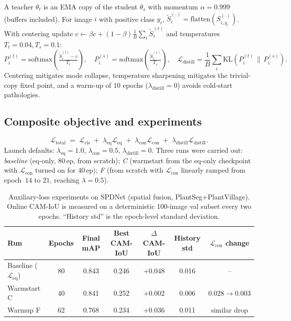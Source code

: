 \documentclass[11pt,a4paper]{article}
\newcommand{\Leq}{\mathcal{L}_{\mathrm{eq}}}
\newcommand{\Lcon}{\mathcal{L}_{\mathrm{con}}}
\newcommand{\Ldist}{\mathcal{L}_{\mathrm{distill}}}
\newcommand{\Lcls}{\mathcal{L}_{\mathrm{cls}}}
\newcommand{\Ltotal}{\mathcal{L}_{\mathrm{total}}}
\begin{document}
A teacher $\theta_t$ is an EMA copy of the student $\theta_s$ with
momentum $\alpha=0.999$ (buffers included). For image $i$ with
positive class $y_i$, $\tilde S^{(\cdot)}_i\!=\!\mathrm{flatten}(S^{(\cdot)}_{i,y_i})$.
With centering update $c\leftarrow\beta c+(1-\beta)\frac1B\sum_i\tilde S^{(t)}_i$
and temperatures $T_t{=}0.04,T_s{=}0.1$:
\begin{equation}
P^{(t)}_i\!=\!\mathrm{softmax}\!\left(\!\tfrac{\tilde S^{(t)}_i-c}{T_t}\!\right)\!,\quad
P^{(s)}_i\!=\!\mathrm{softmax}\!\left(\!\tfrac{\tilde S^{(s)}_i}{T_s}\!\right)\!,\quad
\Ldist\!=\!\frac{1}{B}\!\sum_i\!\mathrm{KL}(P^{(t)}_i\,\|\,P^{(s)}_i).
\label{eq:Ldist}
\end{equation}
Centering mitigates mode collapse, temperature sharpening mitigates the
trivial-copy fixed point, and a warm-up of $10$ epochs
($\lambda_{\mathrm{distill}}{=}0$) avoids cold-start pathologies.

\subsection{Composite objective and experiments}

\begin{equation}
\Ltotal \;=\; \Lcls \;+\; \lambda_{\mathrm{eq}}\Leq \;+\;
\lambda_{\mathrm{con}}\Lcon \;+\; \lambda_{\mathrm{distill}}\Ldist.
\end{equation}
Launch defaults: $\lambda_{\mathrm{eq}}\!=\!1.0$, $\lambda_{\mathrm{con}}\!=\!0.5$,
$\lambda_{\mathrm{distill}}\!=\!0$. Three runs were carried out:
\emph{baseline} (eq-only, $80$\,ep, from scratch); \emph{C} (warmstart
from the eq-only checkpoint with $\Lcon$ turned on for $40$\,ep);
\emph{F} (from scratch with $\Lcon$ linearly ramped from
epoch~$14$ to $21$, reaching $\lambda=0.5$).

\begin{table}[t]
\centering
\small
\caption{Auxiliary-loss experiments on SPDNet (spatial fusion,
PlantSeg+PlantVillage). Online CAM-IoU is measured on a deterministic
100-image val subset every two epochs. ``History std'' is the
epoch-level standard deviation.}
\label{tab:aux}
\begin{tabular}{@{}lcccccc@{}}
\toprule
Run & Epochs & Final mAP & Best CAM-IoU & $\Delta$ CAM-IoU & History std & $\Lcon$ change\\
\midrule
Baseline ($\Leq$) & 80 & 0.843 & 0.246 & $+0.048$ & 0.016 & --\\
Warmstart C       & 40 & 0.841 & 0.252 & $+0.002$ & 0.006 & $0.028\!\to\!0.003$\\
Warmup F          & 62 & 0.768 & 0.234 & $+0.036$ & 0.011 & similar drop\\
\bottomrule
\end{tabular}
\end{table}
\end{document}
